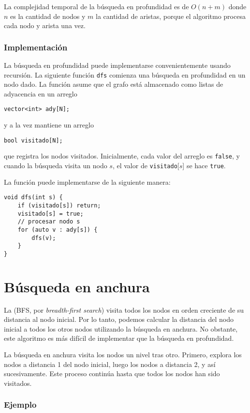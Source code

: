 La complejidad temporal de la búsqueda en profundidad es de $O(n+m)$
donde $n$ es la cantidad de nodos y $m$ la cantidad de aristas,
porque el algoritmo procesa cada nodo y arista una vez.

\subsubsection*{Implementación}

La búsqueda en profundidad puede implementarse convenientemente
usando recursión. La siguiente función \texttt{dfs} comienza una
búsqueda en profundidad en un nodo dado. La función asume que
el grafo está almacenado como listas de adyacencia en un arreglo
\begin{lstlisting}
vector<int> ady[N];
\end{lstlisting}
y a la vez mantiene un arreglo
\begin{lstlisting}
bool visitado[N];
\end{lstlisting}
que registra los nodos visitados.
Inicialmente, cada valor del arreglo es \texttt{false},
y cuando la búsqueda visita un nodo $s$,
el valor de \texttt{visitado}[$s$] se hace \texttt{true}.

La función puede implementarse de la siguiente manera:
\begin{lstlisting}
void dfs(int s) {
    if (visitado[s]) return;
    visitado[s] = true;
    // procesar nodo s
    for (auto v : ady[s]) {
        dfs(v);
    }
}
\end{lstlisting}

\section{Búsqueda en anchura}


La  (BFS, por \textit{breadth-first search})
visita todos los nodos en orden creciente de su distancia al
nodo inicial. Por lo tanto, podemos calcular la distancia del nodo
inicial a todos los otros nodos utilizando la búsqueda en anchura.
No obstante, este algoritmo es más difícil de implementar que la
búsqueda en profundidad.

La búsqueda en anchura visita los nodos un nivel tras otro.
Primero, explora los nodos a distancia 1 del nodo inicial,
luego los nodos a distancia 2, y así sucesivamente.
Este proceso continúa hasta que todos los nodos han sido visitados.

\subsubsection*{Ejemplo}

